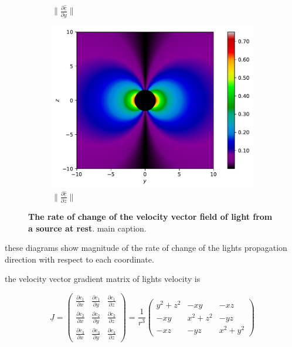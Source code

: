 \begin{figure}[H]
\begin{subfigure}{0.32\textwidth}
		\caption{$\|\frac{\partial \underline{\hat{c}}}{\partial y}\|$}
		\label{fig: Rate of change of lights velocity field of rest source subfig_2}
	\end{subfigure}
	\begin{subfigure}{0.32\textwidth}
		\centering
		\includegraphics[width=\textwidth]{images/pdf/Rate_of_change_of_lights_velocity_field_with_respect_to_z_u_is_0.pdf}
		\caption{$\|\frac{\partial \underline{\hat{c}}}{\partial z}\|$}
		\label{fig: Rate of change of lights velocity field of rest source subfig_3}
	\end{subfigure}
	\caption{\textbf{The rate of change of the velocity vector field of light from a source at rest}. main caption.}
	\label{fig: Rate of change of lights velocity field of rest source}
\end{figure}

these diagrams show magnitude of the rate of change of the lights propagation direction with respect to each coordinate.

the velocity vector gradient matrix of lights velocity is

\begin{equation}
	\underline{J} =
	\begin{pmatrix}
		\frac{\partial c_1}{\partial x} & \frac{\partial c_1}{\partial y} & \frac{\partial c_1}{\partial z} \\
		\frac{\partial c_2}{\partial x} & \frac{\partial c_2}{\partial y} & \frac{\partial c_2}{\partial z}
		\\
		\frac{\partial c_3}{\partial x} & \frac{\partial c_3}{\partial y} & \frac{\partial c_3}{\partial z}
	\end{pmatrix}
	= \frac{1}{ r^3 }
	\begin{pmatrix}
		y^2 + z^2 & -xy       & -xz       \\
		-xy       & x^2 + z^2 & -yz       \\
		-xz       & -yz       & x^2 + y^2
	\end{pmatrix}
\end{equation}

